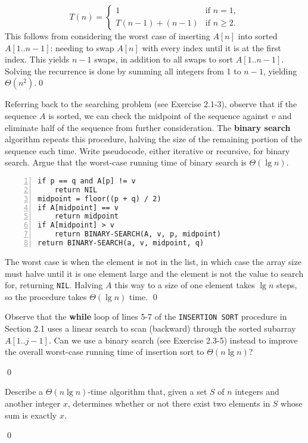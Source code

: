 \sol $$T(n) = \begin{cases}
    1 & \text{if } n=1, \\
    T(n-1) + (n-1)& \text{if } n \geq 2.
\end{cases}$$
This follows from considering the worst case of inserting $A[n]$ into sorted $A[1..n-1]$: needing to swap $A[n]$ with every index until it is at the first index. This yields $n-1$ swaps, in addition to all swaps to sort $A[1..n-1]$. Solving the recurrence is done by summing all integers from 1 to $n-1$, yielding $\Theta(n^2)$.\qed

 Referring back to the searching problem (see Exercise 2.1-3), observe that if the sequence $A$ is sorted, we can check the midpoint of the sequence against $v$ and eliminate half of the sequence from further consideration. The \textbf{binary search} algorithm repeats this procedure, halving the size of the remaining portion of the sequence each time. Write pseudocode, either iterative or recursive, for binary search. Argue that the worst-case running time of binary search is $\Theta(\lg n)$.

\sol \begin{Verbatim}[frame=single,numbers=left,samepage=true,label={BINARY-SEARCH(A, v, p, q)}]
if p == q and A[p] != v
    return NIL
midpoint = floor((p + q) / 2)
if A[midpoint] == v
    return midpoint
if A[midpoint] > v
    return BINARY-SEARCH(A, v, p, midpoint)
return BINARY-SEARCH(a, v, midpoint, q)
\end{Verbatim}
The worst case is when the element is not in the list, in which case the array size must halve until it is one element large and the element is not the value to search for, returning \verb|NIL|. Halving $A$ this way to a size of one element takes $\lg n$ steps, so the procedure takes $\Theta(\lg n)$ time.
\qed

 Observe that the \textbf{while} loop of lines 5-7 of the \verb|INSERTION SORT| procedure in Section 2.1 uses a linear search to scan (backward) through the sorted subarray $A[1..j-1]$. Can we use a binary search (see Exercise 2.3-5) instead to improve the overall worst-case running time of insertion sort to $\Theta(n \lg n)$?

\sol \qed

 Describe a $\Theta(n \lg n)$-time algorithm that, given a set $S$ of $n$ integers and another integer $x$, determines whether or not there exist two elements in $S$ whose sum is exactly $x$.

\sol \qed

